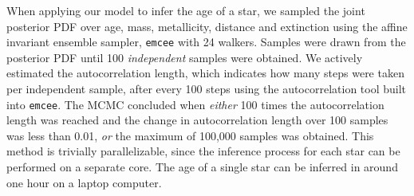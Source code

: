 
When applying our model to infer the age of a star, we sampled the joint
posterior PDF over age, mass, metallicity, distance and extinction using the
affine invariant ensemble sampler, {\tt emcee} \citep{foreman-mackey2013} with
24 walkers.
Samples were drawn from the posterior PDF until 100 {\it independent} samples
were obtained.
We actively estimated the autocorrelation length, which indicates how many
steps were taken per independent sample, after every 100 steps using the
autocorrelation tool built into {\tt emcee}.
The MCMC concluded when {\it either} 100 times the autocorrelation length was
reached and the change in autocorrelation length over 100 samples was less
than 0.01, {\it or} the maximum of 100,000 samples was obtained.
This method is trivially parallelizable, since the inference process for each
star can be performed on a separate core.
The age of a single star can be inferred in around one hour on a laptop
computer.

